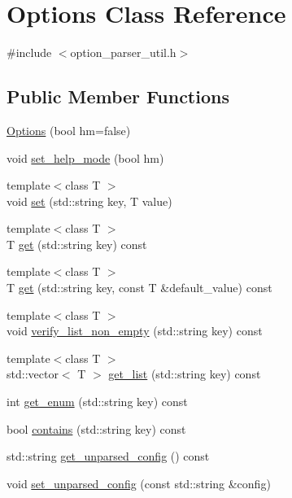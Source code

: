 \hypertarget{classOptions}{\section{Options Class Reference}
\label{classOptions}
}


{\ttfamily \#include $<$option\-\_\-parser\-\_\-util.\-h$>$}

\subsection*{Public Member Functions}
\begin{DoxyCompactItemize}
\item 
\hyperlink{classOptions_a10145b91789f83fc9674f128d92fd4b0}{Options} (bool hm=false)
\item 
void \hyperlink{classOptions_af7b9a4c275ac0a80ea853ae7d51cae51}{set\-\_\-help\-\_\-mode} (bool hm)
\item 
{\footnotesize template$<$class T $>$ }\\void \hyperlink{classOptions_a442b5282575a1c2c4db119021ab8715d}{set} (std\-::string key, T value)
\item 
{\footnotesize template$<$class T $>$ }\\T \hyperlink{classOptions_a806470a0ddf00e44814367ff771ac33a}{get} (std\-::string key) const 
\item 
{\footnotesize template$<$class T $>$ }\\T \hyperlink{classOptions_a31fc7c11f256b0669c99250a3682d69f}{get} (std\-::string key, const T \&default\-\_\-value) const 
\item 
{\footnotesize template$<$class T $>$ }\\void \hyperlink{classOptions_aec0a66ed37817abc9e131bd081d46f5a}{verify\-\_\-list\-\_\-non\-\_\-empty} (std\-::string key) const 
\item 
{\footnotesize template$<$class T $>$ }\\std\-::vector$<$ T $>$ \hyperlink{classOptions_a3dd5279c438308943c8d6db41103e932}{get\-\_\-list} (std\-::string key) const 
\item 
int \hyperlink{classOptions_ad9bf14674bec42487e3dcd6f2c7a83e1}{get\-\_\-enum} (std\-::string key) const 
\item 
bool \hyperlink{classOptions_a92594d318d5bd1c4cff9e8fef0e108ed}{contains} (std\-::string key) const 
\item 
std\-::string \hyperlink{classOptions_ae8061eb7d905cda89598b6a4d360f1b1}{get\-\_\-unparsed\-\_\-config} () const 
\item 
void \hyperlink{classOptions_a4ce7d22ca205a18d73f5bdbd255c69d7}{set\-\_\-unparsed\-\_\-config} (const std\-::string \&config)
\end{DoxyCompactItemize}
